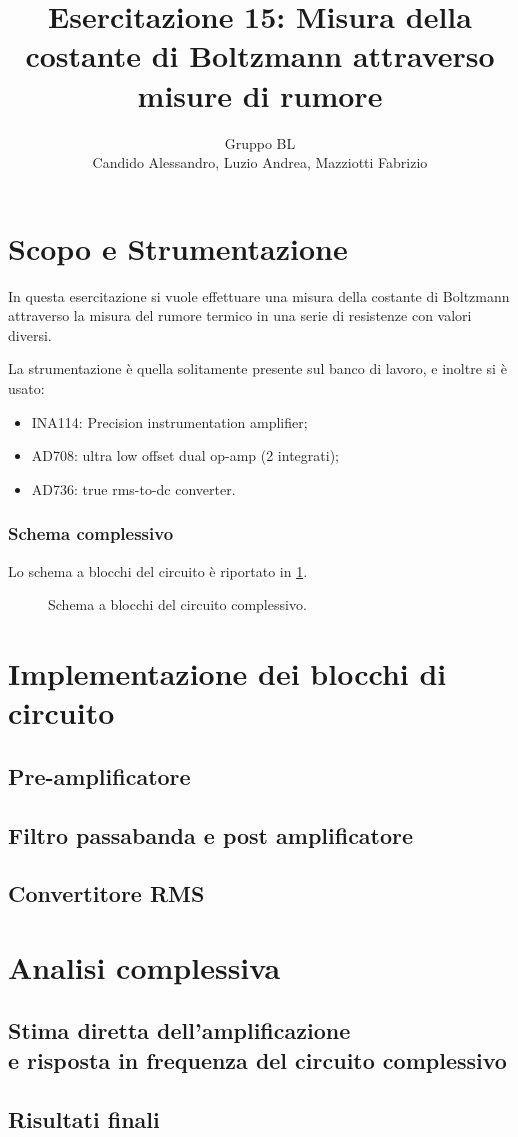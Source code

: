 \documentclass[a4paper,10pt]{article}
\title{Esercitazione 15: Misura della costante di Boltzmann attraverso misure di rumore}
\author{Gruppo BL \\ Candido Alessandro, Luzio Andrea, Mazziotti Fabrizio}
\begin{document}
\maketitle

\section{Scopo e Strumentazione}
In questa esercitazione si vuole effettuare una misura della costante di Boltzmann attraverso la
misura del rumore termico in una serie di resistenze con valori diversi.

\noindent La strumentazione è quella solitamente presente sul banco di lavoro, e inoltre si è usato:
\begin{itemize}
	\item INA114: Precision instrumentation amplifier;
	\item AD708: ultra low offset dual op-amp (2 integrati);
	\item AD736: true rms-to-dc converter.
\end{itemize}

\subsubsection*{Schema complessivo}

Lo schema a blocchi del circuito è riportato in \cref{fig:blocks}.

\begin{figure}[H]
	\centering
	\vspace*{10pt}
	\caption{Schema a blocchi del circuito complessivo.}
	\label{fig:blocks}
\end{figure}

\section{Implementazione dei blocchi di circuito}

\subsection{Pre-amplificatore}

\subsection{Filtro passabanda e post amplificatore}

\subsection{Convertitore RMS}

\section{Analisi complessiva} %

\subsection{Stima diretta dell'amplificazione \\e risposta in frequenza del circuito complessivo}

\subsection{Risultati finali}
\end{document}
